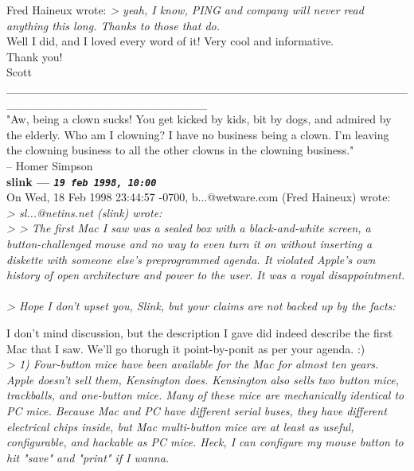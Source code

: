 \documentclass[11pt,twoside,a4paper]{article}
\begin{document}
\begin{multicols*}{2}
Fred Haineux wrote:
\emph{> yeah, I know, PING and company will never read anything this long. Thanks to those that do.} ~\\

Well I did, and I loved every word of it! Very cool and informative. ~\\
Thank you! ~\\
Scott ~\\

\_\_\_\_\_\_\_\_\_\_\_\_\_\_\_\_\_\_\_\_\_\_\_\_\_\_\_\_\_\_\_\_\_\_\_\_\_\_\_\_\_\_\_\_\_\_\_\_\_\_\_\_\_\_\_\_\_\_\_\_\_\_\_\_\_\_\_\_\_\_\_\_ ~\\

"Aw, being a clown sucks! You get kicked by kids, bit by dogs, and admired by the elderly. Who am I clowning? I have no business being a clown. I'm leaving the clowning business to all the other clowns in the clowning business." ~\\
-- Homer Simpson ~\\

 
		
	
		
\textbf{slink --- \emph{\texttt{19 feb 1998, 10:00}}}~\\

On Wed, 18 Feb 1998 23:44:57 -0700, b...@wetware.com (Fred Haineux) wrote: ~\\

\emph{> sl...@netins.net (slink) wrote:} ~\\
\emph{> > The first Mac I saw was a sealed box with a black-and-white screen, a button-challenged mouse and no way to even turn it on without inserting a diskette with someone else's preprogrammed agenda.  It violated Apple's own history of open architecture and power to the user.  It was a royal disappointment.} ~\\

\emph{> Hope I don't upset you, Slink, but your claims are not backed up by the facts:}

I don't mind discussion, but the description I gave did indeed describe the first Mac that I saw.  We'll go thorugh it point-by-ponit as per your agenda.  :) ~\\

\emph{> 1) Four-button mice have been available for the Mac for almost ten years. Apple doesn't sell them, Kensington does. Kensington also sells two button mice, trackballs, and one-button mice. Many of these mice are mechanically identical to PC mice. Because Mac and PC have different serial buses, they have different electrical chips inside, but Mac multi-button mice are at least as useful, configurable, and hackable as PC mice. Heck, I can configure my mouse button to hit "save" and "print" if I wanna.} ~\\


\end{multicols*}
\end{document}
